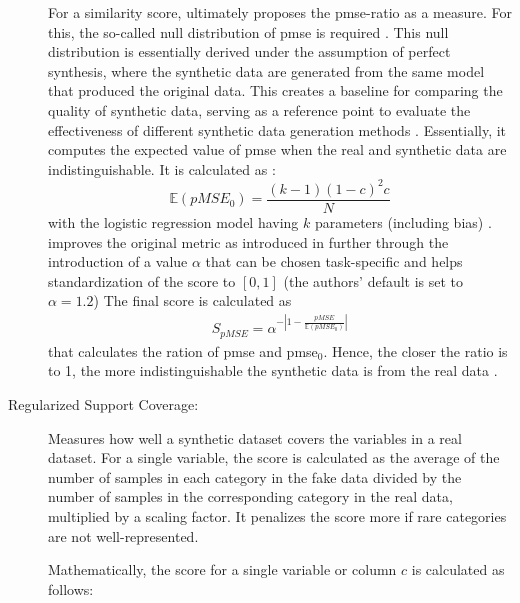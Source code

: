 \begin{description}
  For a similarity score, \textcite{snoke2018GeneralSpecificUtility} ultimately proposes the \gls{pmse}-ratio as a measure.
  For this, the so-called null distribution of \gls{pmse} is required \cite[p. 668]{snoke2018GeneralSpecificUtility}.
  This null distribution is essentially derived under the assumption of perfect synthesis, where the synthetic data are generated from the same model that produced the original data. 
  This creates a baseline for comparing the quality of synthetic data, serving as a reference point to evaluate the effectiveness of different synthetic data generation methods \cite{snoke2018GeneralSpecificUtility}.
  Essentially, it computes the expected value of \gls{pmse} when the real and synthetic data are indistinguishable.
  It is calculated as \cite{snoke2018GeneralSpecificUtility,chundawat2022UniversalMetricRobust}:
  $$\mathbb{E}(pMSE_0) = \frac{(k-1)(1-c)^2c}{N}$$
  with the logistic regression model having $k$ parameters (including bias) \cite{chundawat2022UniversalMetricRobust}.
  \cite{chundawat2022UniversalMetricRobust} improves the original metric as introduced in \cite{snoke2018GeneralSpecificUtility} further through the introduction
  of a value $\alpha$ that can be chosen task-specific and helps standardization of the score to $[0,1]$ (the authors' default is set to $\alpha=1.2$)
  The final score is calculated as 
  \begin{equation}
    \begin{align*}
      \label{eqn:s_pmse}
      S_{pMSE} = \alpha^{-|1-\frac{pMSE}{\mathbb{E}(pMSE_0)}|}
      \end{align*}
  \end{equation}
  that calculates the ration of \gls{pmse} and \gls{pmse}$_0$.
  Hence, the closer the ratio is to 1, the more indistinguishable the synthetic data is from the real data \cite{chundawat2022UniversalMetricRobust}.
  

  \item[Regularized Support Coverage:]
  Measures how well a synthetic dataset covers the variables in a real dataset. 
  For a single variable, the score is calculated as the average of the number of samples in each category in the fake data 
  divided by the number of samples in the corresponding category in the real data, multiplied by a scaling factor. 
  It penalizes the score more if rare categories are not well-represented. 
  
  Mathematically, the score for a single variable or column $c$ is calculated as follows:


\end{description}

